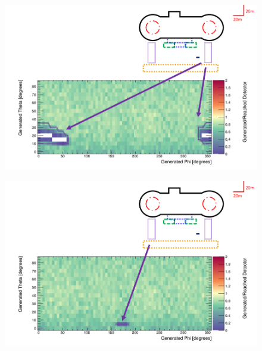 \begin{figure}
 \centering
 \includegraphics[width=\linewidth]{Chapter5/Figs/wylfaRasterNew/steamBridgeCloseGen_Reached.png}
 \label{fig:steamBridgeCloseGen_Reached}
\end{figure}

\begin{figure}
 \centering
 \includegraphics[width=\linewidth]{Chapter5/Figs/wylfaRasterNew/steamBridgeFarGen_Reached.png}
 \label{fig:steamBridgeFarGen_Reached}
\end{figure}

